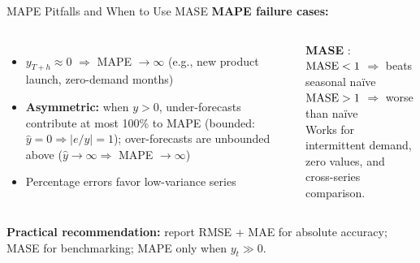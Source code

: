 \documentclass[aspectratio=169, 11pt]{beamer}
\begin{document}
\begin{frame}{MAPE Pitfalls and When to Use MASE}
  \textbf{MAPE failure cases:}
  \begin{columns}[T]
      \begin{itemize}\small
        \item $y_{T+h} \approx 0$ $\Rightarrow$ MAPE $\to \infty$
              (e.g., new product launch, zero-demand months)
        \item \textbf{Asymmetric:} when $y>0$, under-forecasts contribute
              at most 100\% to MAPE (bounded: $\hat{y}=0 \Rightarrow |e/y|=1$);
              over-forecasts are unbounded above
              ($\hat{y}\to\infty \Rightarrow$ MAPE $\to\infty$)
        \item Percentage errors favor low-variance series
      \end{itemize}
      \begin{keybox}
        {\small \textbf{MASE} \parencite{Hyndman2006}:\\[2pt]
        $\operatorname{MASE} < 1$ $\Rightarrow$ beats seasonal na\"{i}ve\\
        $\operatorname{MASE} > 1$ $\Rightarrow$ worse than na\"{i}ve\\[2pt]
        Works for intermittent demand, zero values, and cross-series
        comparison.}
      \end{keybox}
  \end{columns}
  \vspace{0.1cm}
  \textbf{Practical recommendation:} report RMSE + MAE for absolute
  accuracy; MASE for benchmarking; MAPE only when $y_t \gg 0$.
\end{frame}
\end{document}

